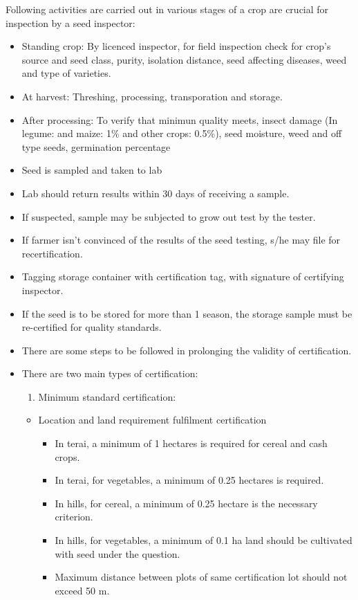 \documentclass[
  openany]{book}
\providecommand{\tightlist}{%
  \setlength{\itemsep}{0pt}\setlength{\parskip}{0pt}}
\begin{document}
Following activities are carried out in various stages of a crop are crucial for inspection by a seed inspector:

\begin{itemize}
\item
  Standing crop: By licenced inspector, for field inspection check for crop's source and seed class, purity, isolation distance, seed affecting diseases, weed and type of varieties.
\item
  At harvest: Threshing, processing, transporation and storage.
\item
  After processing: To verify that minimun quality meets, insect damage (In legume: and maize: 1\% and other crops: 0.5\%), seed moisture, weed and off type seeds, germination percentage
\item
  Seed is sampled and taken to lab
\item
  Lab should return results within 30 days of receiving a sample.
\item
  If suspected, sample may be subjected to grow out test by the tester.
\item
  If farmer isn't convinced of the results of the seed testing, s/he may file for recertification.
\item
  Tagging storage container with certification tag, with signature of certifying inspector.
\item
  If the seed is to be stored for more than 1 season, the storage sample must be re-certified for quality standards.
\item
  There are some steps to be followed in prolonging the validity of certification.
\item
  There are two main types of certification:

  \begin{enumerate}
  \def\labelenumi{\arabic{enumi}.}
  \tightlist
  \item
    Minimum standard certification:
  \end{enumerate}

  \begin{itemize}
  \tightlist
  \item
    Location and land requirement fulfilment certification

    \begin{itemize}
    \tightlist
    \item
      In terai, a minimum of 1 hectares is required for cereal and cash crops.
    \item
      In terai, for vegetables, a minimum of 0.25 hectares is required.
    \item
      In hills, for cereal, a minimum of 0.25 hectare is the necessary criterion.
    \item
      In hills, for vegetables, a minimum of 0.1 ha land should be cultivated with seed under the question.
    \item
      Maximum distance between plots of same certification lot should not exceed 50 m.
    \end{itemize}
  \end{itemize}


\end{itemize}
\end{document}
